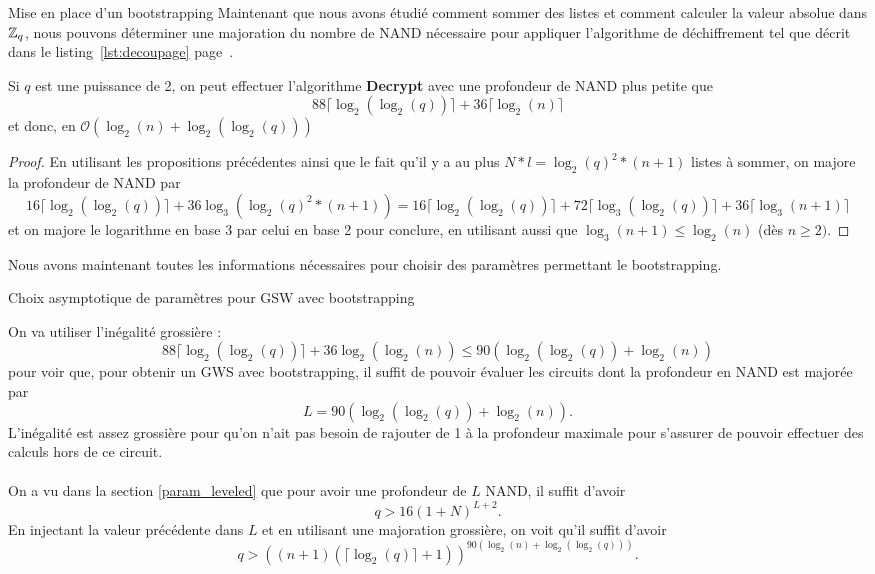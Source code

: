 \begin{section}{Mise en place d'un bootstrapping}
Maintenant que nous avons étudié comment sommer des listes et comment calculer la valeur absolue dans
$\mathbb{Z}_q$, nous pouvons déterminer une majoration du nombre de NAND nécessaire pour appliquer l'algorithme
de déchiffrement tel que décrit dans le listing~\ref{lst:decoupage} page~\pageref{lst:decoupage}.
\begin{thm} \label{size_dec}
Si $q$ est une puissance de 2, on peut effectuer 
l'algorithme \textbf{Decrypt} avec une profondeur de NAND plus petite que
\[88 \lceil \log_2(\log_2(q)) \rceil + 36 \lceil \log_2(n) \rceil \]
et donc, en $\mathcal{O}(\log_2(n) + \log_2(\log_2(q)))$
\end{thm}
\begin{proof}
En utilisant les propositions précédentes ainsi que le fait qu'il y a au plus $N*l = \log_2(q)^2 * (n+1)$ listes à
sommer, on majore la profondeur de NAND par
\[16 \lceil \log_2(\log_2(q)) \rceil + 36 \log_3\left(\log_2(q)^2
*(n+1)\right) = 16 \lceil \log_2(\log_2(q)) \rceil + 72 \lceil \log_3(\log_2(q)) \rceil + 36 \lceil \log_3(n+1) \rceil \]
et on majore le logarithme en base 3 par celui en base 2 pour conclure, en
utilisant aussi que $\log_3(n+1) \leqslant\log_2(n)$ (dès $n \geqslant 2)$.
\end{proof}

Nous avons maintenant toutes les informations nécessaires pour choisir des paramètres permettant le bootstrapping.

\begin{subsection}{Choix asymptotique de paramètres pour GSW avec bootstrapping}
\label{sec:bootstrapping}

On va utiliser l'inégalité grossière :
\[88 \lceil\log_2(\log_2(q))\rceil + 36 \log_2(\log_2(n)) \leqslant 90\left(\log_2(\log_2(q)) + \log_2(n)\right) \]
pour voir que, pour obtenir un GWS avec bootstrapping, il suffit de pouvoir évaluer les circuits dont la profondeur en NAND est majorée par
\[ L = 90 \left(\log_2(\log_2(q)) + \log_2(n)\right). \]
L'inégalité est assez grossière pour qu'on n'ait pas besoin de rajouter de 1 à la profondeur maximale pour s'assurer de pouvoir effectuer des calculs hors de ce circuit.

\paragraph{}
On a vu dans la section \ref{param_leveled} que pour avoir une
profondeur de $L$ NAND, il suffit d'avoir
\begin{equation*}
q > 16 {(1+N)}^{L+2}.
\end{equation*}
En injectant la valeur précédente dans $L$ et en utilisant une majoration
grossière, on voit qu'il suffit d'avoir
\begin{equation}
q > {\left((n+1)(\lceil \log_2(q) \rceil + 1 )\right)}^{90 \left(\log_2(n) +
\log_2(\log_2(q))\right)}.
\end{equation}


\end{subsection}
\end{section}

